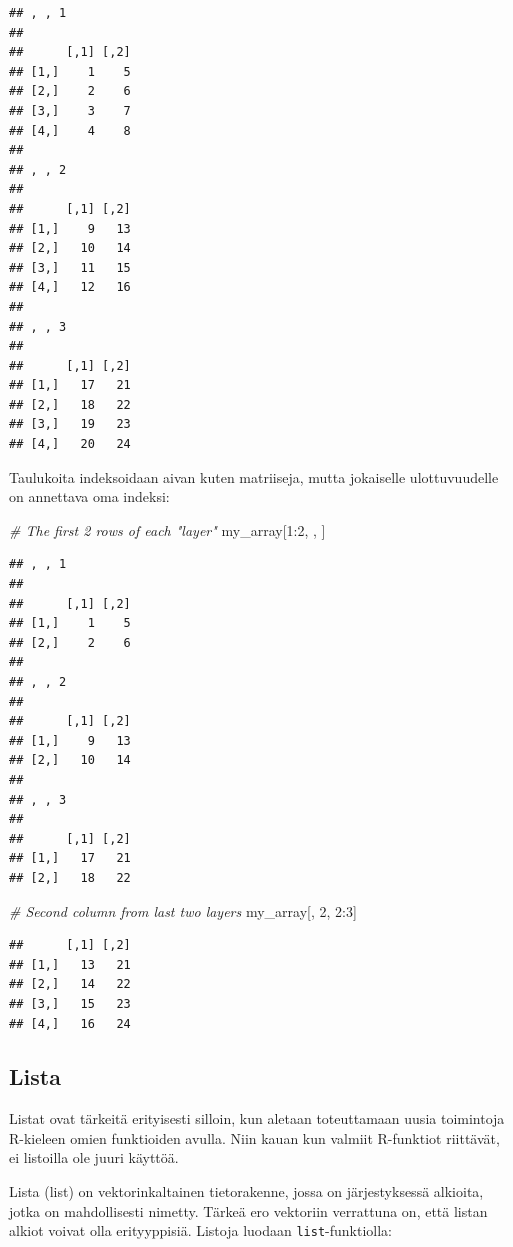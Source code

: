 \documentclass[
]{book}
\newenvironment{Shaded}{\begin{snugshade}}{\end{snugshade}}
\newcommand{\CommentTok}[1]{\textcolor[rgb]{0.56,0.35,0.01}{\textit{#1}}}
\newcommand{\DecValTok}[1]{\textcolor[rgb]{0.00,0.00,0.81}{#1}}
\newcommand{\NormalTok}[1]{#1}
\newcommand{\SpecialCharTok}[1]{\textcolor[rgb]{0.00,0.00,0.00}{#1}}
\begin{document}
\begin{verbatim}
## , , 1
## 
##      [,1] [,2]
## [1,]    1    5
## [2,]    2    6
## [3,]    3    7
## [4,]    4    8
## 
## , , 2
## 
##      [,1] [,2]
## [1,]    9   13
## [2,]   10   14
## [3,]   11   15
## [4,]   12   16
## 
## , , 3
## 
##      [,1] [,2]
## [1,]   17   21
## [2,]   18   22
## [3,]   19   23
## [4,]   20   24
\end{verbatim}

Taulukoita indeksoidaan aivan kuten matriiseja, mutta jokaiselle ulottuvuudelle on annettava oma indeksi:

\begin{Shaded}
\begin{Highlighting}[]
\CommentTok{\# The first 2 rows of each "layer"}
\NormalTok{my\_array[}\DecValTok{1}\SpecialCharTok{:}\DecValTok{2}\NormalTok{, , ]}
\end{Highlighting}
\end{Shaded}

\begin{verbatim}
## , , 1
## 
##      [,1] [,2]
## [1,]    1    5
## [2,]    2    6
## 
## , , 2
## 
##      [,1] [,2]
## [1,]    9   13
## [2,]   10   14
## 
## , , 3
## 
##      [,1] [,2]
## [1,]   17   21
## [2,]   18   22
\end{verbatim}

\begin{Shaded}
\begin{Highlighting}[]
\CommentTok{\# Second column from last two layers}
\NormalTok{my\_array[, }\DecValTok{2}\NormalTok{, }\DecValTok{2}\SpecialCharTok{:}\DecValTok{3}\NormalTok{]}
\end{Highlighting}
\end{Shaded}

\begin{verbatim}
##      [,1] [,2]
## [1,]   13   21
## [2,]   14   22
## [3,]   15   23
## [4,]   16   24
\end{verbatim}

\hypertarget{list}{%
\subsection{Lista}\label{list}}

Listat ovat tärkeitä erityisesti silloin, kun aletaan toteuttamaan uusia toimintoja R-kieleen omien funktioiden avulla. Niin kauan kun valmiit R-funktiot riittävät, ei listoilla ole juuri käyttöä.

Lista (list) on vektorinkaltainen tietorakenne, jossa on järjestyksessä alkioita, jotka on mahdollisesti nimetty. Tärkeä ero vektoriin verrattuna on, että listan alkiot voivat olla erityyppisiä. Listoja luodaan \texttt{list}-funktiolla:
\end{document}
